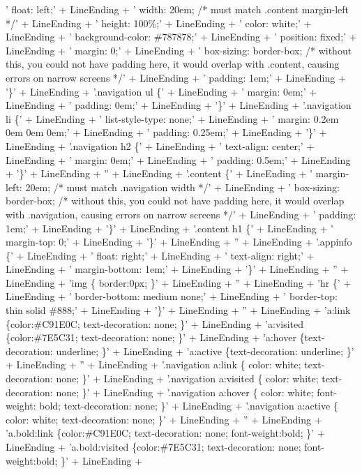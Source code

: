 \documentclass{report}
\begin{document}
\begin{list}{}
\begin{flushleft}
\begin{ttfamily}
'  float: left;' + LineEnding +
'  width: 20em; /* must match .content margin-left */' + LineEnding +
'  height: 100{\%};' + LineEnding +
'  color: white;' + LineEnding +
'  background-color: {\#}787878;' + LineEnding +
'  position: fixed;' + LineEnding +
'  margin: 0;' + LineEnding +
'  box-sizing: border-box; /* without this, you could not have padding here, it would overlap with .content, causing errors on narrow screens */' + LineEnding +
'  padding: 1em;' + LineEnding +
'{\}}' + LineEnding +
'.navigation ul {\{}' + LineEnding +
'  margin: 0em;' + LineEnding +
'  padding: 0em;' + LineEnding +
'{\}}' + LineEnding +
'.navigation li {\{}' + LineEnding +
'  list-style-type: none;' + LineEnding +
'  margin: 0.2em 0em 0em 0em;' + LineEnding +
'  padding: 0.25em;' + LineEnding +
'{\}}' + LineEnding +
'.navigation h2 {\{}' + LineEnding +
'  text-align: center;' + LineEnding +
'  margin: 0em;' + LineEnding +
'  padding: 0.5em;' + LineEnding +
'{\}}' + LineEnding +
'' + LineEnding +
'.content {\{}' + LineEnding +
'  margin-left: 20em; /* must match .navigation width */' + LineEnding +
'  box-sizing: border-box; /* without this, you could not have padding here, it would overlap with .navigation, causing errors on narrow screens */' + LineEnding +
'  padding: 1em;' + LineEnding +
'{\}}' + LineEnding +
'.content h1 {\{}' + LineEnding +
'  margin-top: 0;' + LineEnding +
'{\}}' + LineEnding +
'' + LineEnding +
'.appinfo {\{}' + LineEnding +
'  float: right;' + LineEnding +
'  text-align: right;' + LineEnding +
'  margin-bottom: 1em;' + LineEnding +
'{\}}' + LineEnding +
'' + LineEnding +
'img {\{} border:0px; {\}}' + LineEnding +
'' + LineEnding +
'hr {\{}' + LineEnding +
'  border-bottom: medium none;' + LineEnding +
'  border-top: thin solid {\#}888;' + LineEnding +
'{\}}' + LineEnding +
'' + LineEnding +
'a:link {\{}color:{\#}C91E0C; text-decoration: none; {\}}' + LineEnding +
'a:visited {\{}color:{\#}7E5C31; text-decoration: none; {\}}' + LineEnding +
'a:hover {\{}text-decoration: underline; {\}}' + LineEnding +
'a:active {\{}text-decoration: underline; {\}}' + LineEnding +
'' + LineEnding +
'.navigation a:link {\{} color: white; text-decoration: none; {\}}' + LineEnding +
'.navigation a:visited {\{} color: white; text-decoration: none; {\}}' + LineEnding +
'.navigation a:hover {\{} color: white; font-weight: bold; text-decoration: none; {\}}' + LineEnding +
'.navigation a:active {\{} color: white; text-decoration: none; {\}}' + LineEnding +
'' + LineEnding +
'a.bold:link {\{}color:{\#}C91E0C; text-decoration: none; font-weight:bold; {\}}' + LineEnding +
'a.bold:visited {\{}color:{\#}7E5C31; text-decoration: none; font-weight:bold; {\}}' + LineEnding +

\end{ttfamily}
\end{flushleft}
\end{list}
\end{document}

